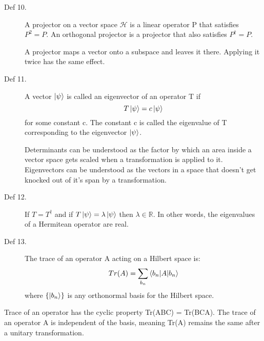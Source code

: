 \documentclass[12pt]{article}
\begin{document}
\begin{description}
    \item[Def 10.] A projector on a vector space \(\mathcal{H}\) is a linear operator P that satisfies \(P^2 = P\). An orthogonal projector is a projector that also satisfies \(P^\dagger = P\). 

    \begin{mdframed}
        A projector maps a vector onto a subspace and leaves it there. Applying it twice has the same effect.
    \end{mdframed}
\end{description}

\begin{description}
    \item[Def 11.] A vector \(\ket{\psi}\) is called an eigenvector of an operator T if 
    \begin{equation}
        T\ket{\psi} = c\ket{\psi}
    \end{equation}
    for some constant c. The constant c is called the eigenvalue of T corresponding to the eigenvector \(\ket{\psi}\).

    \begin{mdframed}
        Determinants can be understood as the factor by which an area inside a vector space gets scaled when a transformation is applied to it. Eigenvectors can be understood as the vectors in a space that doesn't get knocked out of it's span by a transformation.
    \end{mdframed}

\end{description}

\begin{description}
    \item[Def 12.] If \(T = T^\dagger\) and if \(T\ket{\psi} = \lambda\ket{\psi}\) then \(\lambda \in \mathbb{R}\). In other words, the eigenvalues of a Hermitean operator are real.
\end{description}

\begin{description}
    \item[Def 13.] The trace of an operator A acting on a Hilbert space is:
    \begin{equation}
        Tr(A) = \sum_{b_n} \braket{b_n|A|b_n}
    \end{equation}
    where \(\{\ket{b_n}\}\) is any orthonormal basis for the Hilbert space.
\end{description}

\begin{mdframed}
    Trace of an operator has the cyclic property Tr(ABC) = Tr(BCA). The trace of an operator A is independent of the basis, meaning Tr(A) remains the same after a unitary transformation.
\end{mdframed}
\end{document}
